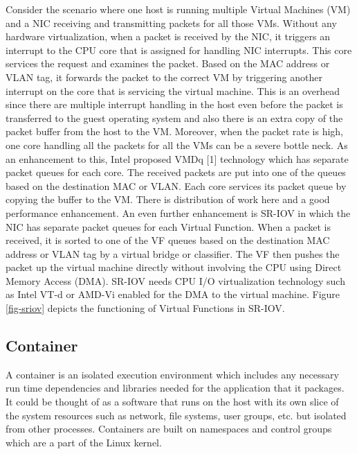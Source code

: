 \documentclass[english, 12pt, a4paper, elec, utf8, a-1b, online]{aaltothesis}
\begin{document}
Consider the scenario where one host is running multiple Virtual Machines (VM) and a NIC receiving and transmitting packets for all those VMs. Without any hardware virtualization, when a packet is received by the NIC, it triggers an interrupt to the CPU core that is assigned for handling NIC interrupts. This core services the request and examines the packet. Based on the MAC address or VLAN tag, it forwards the packet to the correct VM by triggering another interrupt on the core that is servicing the virtual machine. This is an overhead since there are multiple interrupt handling in the host even before the packet is transferred to the guest operating system and also there is an extra copy of the packet buffer from the host to the VM. Moreover, when the packet rate is high, one core handling all the packets for all the VMs can be a severe bottle neck. As an enhancement to this, Intel proposed VMDq [1] technology which has separate packet queues for each core. The received packets are put into one of the queues based on the destination MAC or VLAN. Each core services its packet queue by copying the buffer to the VM. There is distribution of work here and a good performance enhancement. An even further enhancement is SR-IOV in which the NIC has separate packet queues for each Virtual Function. When a packet is received, it is sorted to one of the VF queues based on the destination MAC address or VLAN tag by a virtual bridge or classifier. The VF then pushes the packet up the virtual machine directly without involving the CPU using Direct Memory Access (DMA). SR-IOV needs CPU I/O virtualization technology such as Intel VT-d or AMD-Vi enabled for the DMA to the virtual machine. Figure \ref{fig-sriov} depicts the functioning of Virtual Functions in SR-IOV.

\subsection{Container}
A container is an isolated execution environment which includes any necessary run time dependencies and libraries needed for the application that it packages. It could be thought of as a software that runs on the host with its own slice of the system resources such as network, file systems, user groups, etc. but isolated from other processes. Containers are built on namespaces and control groups which are a part of the Linux kernel.
\end{document}
